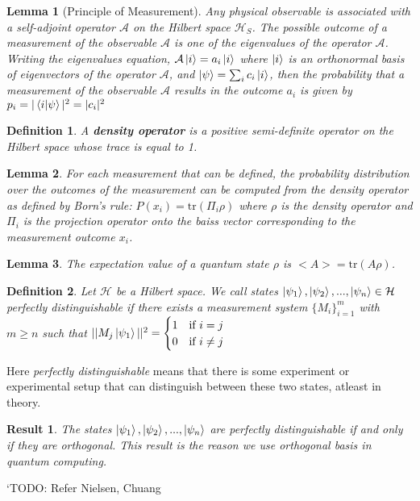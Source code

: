 \documentclass[12pt,twoside,fleqn]{report}
\theoremstyle{thmstyle}
\newtheorem{defn}{Definition}[chapter]
\newtheorem{lemma}{Lemma}[chapter]
\newtheorem{result}{Result}[chapter]
\begin{document}
\begin{lemma}[Principle of Measurement]
Any physical observable is associated with a self-adjoint operator $\mathcal{A}$ on the Hilbert space $\mathcal{H}_S$. The possible outcome of a measurement of the observable $\mathcal{A}$ is one of the eigenvalues of the operator $\mathcal{A}$. \\
Writing the eigenvalues equation, $\mathcal{A} \ket{i} = a_i \ket{i}$ where $\ket{i}$ is an orthonormal basis of eigenvectors of the operator $\mathcal{A}$, and  $\ket{\psi} = \sum_i c_i \ket{i}$,  then the probability that a measurement of the observable $\mathcal{A}$ results in the outcome $a_i$ is given by $p_i = |\braket{i|\psi}|^2 = |c_i|^2$
\end{lemma}


\begin{defn}
    A \textbf{density operator} is a positive semi-definite operator on the Hilbert space whose trace is equal to 1.
\end{defn}

\begin{lemma}
    For each measurement that can be defined, the probability distribution over the outcomes of the measurement can be computed from the density operator as defined by Born's rule:
    $P(x_i) = \text{tr}(\Pi_i \rho)$ where $\rho$ is the density operator and $\Pi_i$ is the projection operator onto the baiss vector corresponding to the measurement outcome $x_i$.
\end{lemma}

\begin{lemma}
    The expectation value of a quantum state $\rho$ is $<A> = \text{tr}(A \rho)$.
\end{lemma}

\begin{defn}
    Let $\mathcal{H}$ be a Hilbert space. We call states $\ket{\psi_1}, \ket{\psi_2}, ..., \ket{\psi_n} \in \mathcal{H}$ perfectly distinguishable if there exists a measurement system $\{ M_i \}_{i=1}^m$ with $m \geq n$ such that $|| M_j \ket{\psi_1} ||^2 = \begin{cases} 1 & \text{if } i = j \\ 0 & \text{if } i \neq j \end{cases}$
\end{defn}
Here \textit{perfectly distinguishable} means that there is some experiment or experimental setup that can distinguish between these two states, atleast in theory.
\begin{result}
    The states $\ket{\psi_1}, \ket{\psi_2}, ..., \ket{\psi_n}$ are perfectly distinguishable if and only if they are orthogonal. This result is the reason we use orthogonal basis in quantum computing.
\end{result}
`TODO: Refer Nielsen, Chuang
\end{document}
